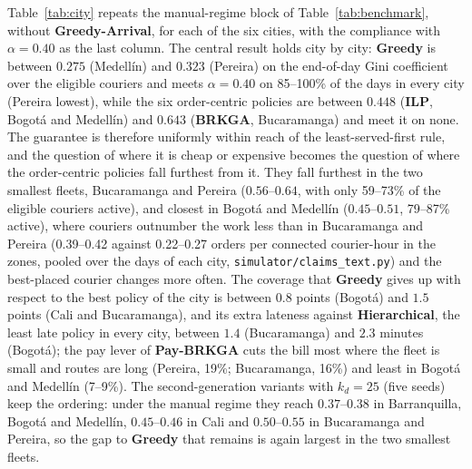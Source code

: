 \documentclass[a4paper,11pt,review,3p,authoryear]{elsarticle}
\begin{document}
Table~\ref{tab:city} repeats the manual-regime block of Table~\ref{tab:benchmark}, without \textbf{Greedy-Arrival}, for each of the six cities, with the compliance with $\alpha = 0.40$ as the last column. The central result holds city by city: \textbf{Greedy} is between $0.275$ (Medell\'in) and $0.323$ (Pereira) on the end-of-day Gini coefficient over the eligible couriers and meets $\alpha = 0.40$ on 85--100\% of the days in every city (Pereira lowest), while the six order-centric policies are between $0.448$ (\textbf{ILP}, Bogot\'a and Medell\'in) and $0.643$ (\textbf{BRKGA}, Bucaramanga) and meet it on none. The guarantee is therefore uniformly within reach of the least-served-first rule, and the question of where it is cheap or expensive becomes the question of where the order-centric policies fall furthest from it. They fall furthest in the two smallest fleets, Bucaramanga and Pereira ($0.56$--$0.64$, with only 59--73\% of the eligible couriers active), and closest in Bogot\'a and Medell\'in ($0.45$--$0.51$, 79--87\% active), where couriers outnumber the work less than in Bucaramanga and Pereira (0.39--0.42 against 0.22--0.27 orders per connected courier-hour in the zones, pooled over the days of each city, \texttt{simulator/claims\_text.py}) and the best-placed courier changes more often. The coverage that \textbf{Greedy} gives up with respect to the best policy of the city is between $0.8$ points (Bogot\'a) and $1.5$ points (Cali and Bucaramanga), and its extra lateness against \textbf{Hierarchical}, the least late policy in every city, between $1.4$ (Bucaramanga) and $2.3$ minutes (Bogot\'a); the pay lever of \textbf{Pay-BRKGA} cuts the bill most where the fleet is small and routes are long (Pereira, 19\%; Bucaramanga, 16\%) and least in Bogot\'a and Medell\'in (7--9\%). The second-generation variants with $k_d = 25$ (five seeds) keep the ordering: under the manual regime they reach $0.37$--$0.38$ in Barranquilla, Bogot\'a and Medell\'in, $0.45$--$0.46$ in Cali and $0.50$--$0.55$ in Bucaramanga and Pereira, so the gap to \textbf{Greedy} that remains is again largest in the two smallest fleets.
\end{document}

